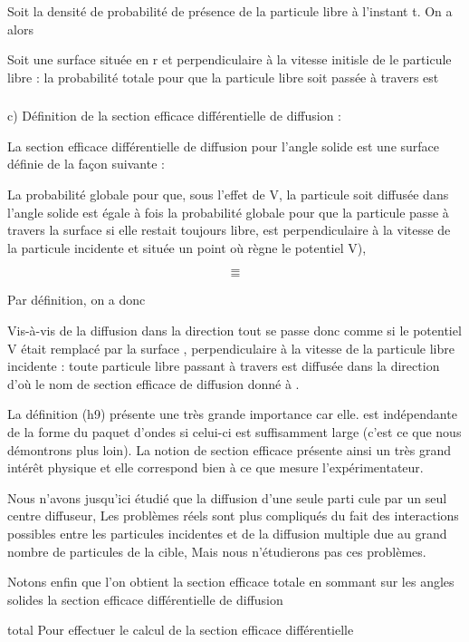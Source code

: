 Soit  la densité de probabilité de présence de la
particule libre  à l'instant t. On a alors

Soit  une surface située en r et perpendiculaire à la vitesse initisle
de le particule libre : la probabilité totale pour que la particule
libre soit passée à travers  est

\subsubsection{}%
c) Définition de la section efficace différentielle de diffusion :

La section efficace différentielle de diffusion pour
l'angle solide  est une surface  définie de la façon suivante :

La probabilité globale pour que, sous l'effet de V, la particule soit diffusée
dans l'angle solide  est égale à  fois
la probabilité globale pour que la particule passe à travers la surface
 si elle restait toujours libre,  est perpendiculaire à la
vitesse de la particule incidente et située  un point  où règne le
potentiel V),

\[
\tag{49}=
\]
\[
\tag{50}=
\]

Par définition, on a donc

Vis-à-vis de la diffusion dans la direction  tout se passe donc comme
si le potentiel V était remplacé par la surface , perpendiculaire
à la vitesse de la particule libre incidente : toute particule libre passant à
travers  est diffusée dans la direction  d'où le nom de
section efficace de diffusion donné à .

La définition (h9) présente une très grande importance car elle.
est indépendante de la forme du paquet d'ondes si celui-ci est suffisamment large
(c'est ce que nous démontrons plus loin). La notion de section
efficace présente ainsi un très grand intérêt physique et elle correspond
bien à ce que mesure l'expérimentateur.

Nous n'avons jusqu'ici étudié que la diffusion d'une seule parti
cule par un seul centre diffuseur, Les problèmes réels sont plus compliqués
du fait des interactions possibles entre les particules incidentes et de
la diffusion multiple due au grand nombre de particules de la cible, Mais
nous n'étudierons pas ces problèmes.

Notons enfin que l'on obtient la section efficace totale en sommant sur les angles
solides la section efficace différentielle de diffusion

total
Pour effectuer le calcul de la section efficace différentielle

